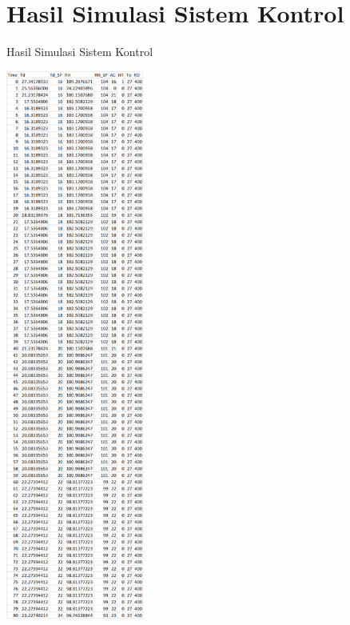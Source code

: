 \section{Hasil Simulasi Sistem Kontrol}
\begin{table}[!h]
	\caption{Hasil Simulasi Sistem Kontrol}
	\label{tbl:A:HasilSimulasiKontrol1}
	\centering
	\includegraphics[width=0.34\textwidth]{figures/HasilSimulasiSimulink1}
\end{table}
\break

